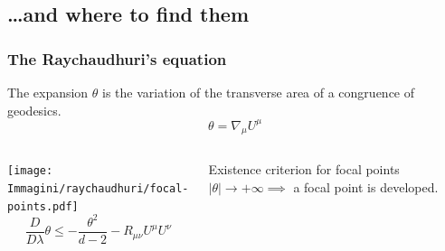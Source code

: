\documentclass[]{beamer}
\begin{document}
	\subsection{\ldots and where to find them}
	\begin{frame}
		\frametitle{The Raychaudhuri's equation}
		\begin{defblock}{The expansion}
			\(\theta\) is the variation of the transverse area of a congruence of geodesics.
			\[
			\theta = \nabla_{\mu}U^{\mu}	
			\]
		\end{defblock}
		\vskip 10pt
		\begin{columns}
			\centering
				\texttt{[image: Immagini/raychaudhuri/focal-points.pdf]}
			\[
				\frac{D}{D\lambda}\theta \le -\frac{\theta^2}{d - 2} - R_{\mu\nu}U^{\mu}U^{\nu}
			\]
			\vskip 10pt
			\begin{ideablock}{Existence criterion for focal points}
				\centering
				\(\vert\theta\vert \rightarrow +\infty \implies \) 
				a focal point is developed.
			\end{ideablock}
		\end{columns}
	\end{frame}
\end{document}
